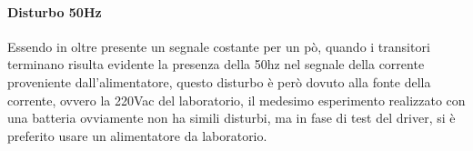 \begin{enumerate}
	      \paragraph{Disturbo 50Hz} Essendo in oltre presente un segnale costante per un pò, quando i transitori terminano risulta evidente la presenza della 50hz nel segnale della corrente proveniente dall'alimentatore, questo disturbo è però dovuto alla fonte della corrente, ovvero la 220Vac del laboratorio, il medesimo esperimento realizzato con una batteria ovviamente non ha simili disturbi, ma in fase di test del driver, si è preferito usare un alimentatore da laboratorio.
\end{enumerate}
